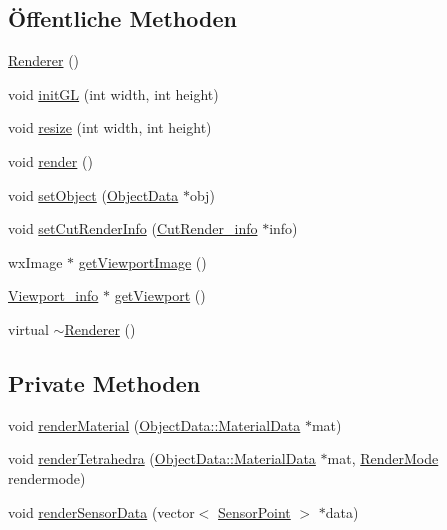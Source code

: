 \subsection*{Öffentliche Methoden}
\begin{DoxyCompactItemize}
\item 
\hyperlink{classRenderer_a7ebf46f54dab9905f79b80f7fddb76a6}{Renderer} ()
\item 
void \hyperlink{classRenderer_a01887363ad27267e44c1ea0f63761a5c}{init\-G\-L} (int width, int height)
\item 
void \hyperlink{classRenderer_a9f4493c538688adaad4e4f0575fd3b8d}{resize} (int width, int height)
\item 
void \hyperlink{classRenderer_af7e5f8f68742f198e315fb4683a605a4}{render} ()
\item 
void \hyperlink{classRenderer_a9db67fbbd309875b564ca1df08daf372}{set\-Object} (\hyperlink{classObjectData}{Object\-Data} $\ast$obj)
\item 
void \hyperlink{classRenderer_a566b30ae615b9cd74d481f360e0a567e}{set\-Cut\-Render\-Info} (\hyperlink{structUtils_1_1CutRender__info}{Cut\-Render\-\_\-info} $\ast$info)
\item 
wx\-Image $\ast$ \hyperlink{classRenderer_afe4e5a9e26320e0b8276b2d0f82a1827}{get\-Viewport\-Image} ()
\item 
\hyperlink{structRenderer_1_1Viewport__info}{Viewport\-\_\-info} $\ast$ \hyperlink{classRenderer_a5bfa9daf1a53660f1cf6c254665253e2}{get\-Viewport} ()
\item 
virtual \hyperlink{classRenderer_afeee408862d5bd6255a6882d47e6d5cd}{$\sim$\-Renderer} ()
\end{DoxyCompactItemize}
\subsection*{Private Methoden}
\begin{DoxyCompactItemize}
\item 
void \hyperlink{classRenderer_acb6c468b92221cf8a121b87a70a3da0c}{render\-Material} (\hyperlink{structObjectData_1_1MaterialData}{Object\-Data\-::\-Material\-Data} $\ast$mat)
\item 
void \hyperlink{classRenderer_a927f376a6283de3181b86f65b927386c}{render\-Tetrahedra} (\hyperlink{structObjectData_1_1MaterialData}{Object\-Data\-::\-Material\-Data} $\ast$mat, \hyperlink{classRenderer_aa9844470f59e9fdf3aed088936100863}{Render\-Mode} rendermode)
\item 
void \hyperlink{classRenderer_ad2eac0343aef1abd05ed95b1b364785f}{render\-Sensor\-Data} (vector$<$ \hyperlink{structUtils_1_1SensorPoint}{Sensor\-Point} $>$ $\ast$data)
\end{DoxyCompactItemize}
